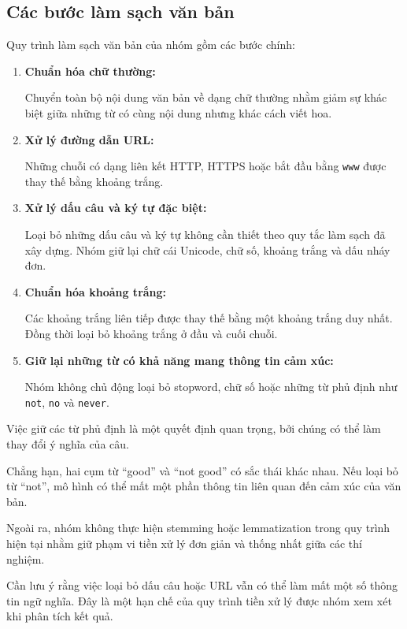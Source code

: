 \subsection{Các bước làm sạch văn bản}

Quy trình làm sạch văn bản của nhóm gồm các bước chính:

\begin{enumerate}
    \item \textbf{Chuẩn hóa chữ thường:}

    Chuyển toàn bộ nội dung văn bản về dạng chữ thường nhằm giảm sự khác biệt giữa những từ có cùng nội dung nhưng khác cách viết hoa.

    \item \textbf{Xử lý đường dẫn URL:}

    Những chuỗi có dạng liên kết HTTP, HTTPS hoặc bắt đầu bằng \texttt{www} được thay thế bằng khoảng trắng.

    \item \textbf{Xử lý dấu câu và ký tự đặc biệt:}

    Loại bỏ những dấu câu và ký tự không cần thiết theo quy tắc làm sạch đã xây dựng. Nhóm giữ lại chữ cái Unicode, chữ số, khoảng trắng và dấu nháy đơn.

    \item \textbf{Chuẩn hóa khoảng trắng:}

    Các khoảng trắng liên tiếp được thay thế bằng một khoảng trắng duy nhất. Đồng thời loại bỏ khoảng trắng ở đầu và cuối chuỗi.

    \item \textbf{Giữ lại những từ có khả năng mang thông tin cảm xúc:}

    Nhóm không chủ động loại bỏ stopword, chữ số hoặc những từ phủ định như \texttt{not}, \texttt{no} và \texttt{never}.
\end{enumerate}

Việc giữ các từ phủ định là một quyết định quan trọng, bởi chúng có thể làm thay đổi ý nghĩa của câu.

Chẳng hạn, hai cụm từ ``good'' và ``not good'' có sắc thái khác nhau. Nếu loại bỏ từ ``not'', mô hình có thể mất một phần thông tin liên quan đến cảm xúc của văn bản.

Ngoài ra, nhóm không thực hiện stemming hoặc lemmatization trong quy trình hiện tại nhằm giữ phạm vi tiền xử lý đơn giản và thống nhất giữa các thí nghiệm.

Cần lưu ý rằng việc loại bỏ dấu câu hoặc URL vẫn có thể làm mất một số thông tin ngữ nghĩa. Đây là một hạn chế của quy trình tiền xử lý được nhóm xem xét khi phân tích kết quả.


